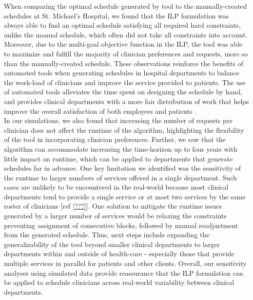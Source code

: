 When comparing the optimal schedule generated by tool to the manually-created schedules at St. Michael's Hospital, we found that the ILP formulation was always able to find an optimal schedule satisfying all required hard constraints, unlike the manual schedule, which often did not take all constraints into account. Moreover, due to the multi-goal objective function in the ILP, the tool was able to maximize and fulfill the majority of clinician preferences and requests, more so than the manually-created schedule. These observations reinforce the benefits of automated tools when generating schedules in hospital departments to balance the work-load of clinicians and improve the service provided to patients. The use of automated tools alleviates the time spent on designing the schedule by hand, and provides clinical departments with a more fair distribution of work that helps improve the overall satisfaction of both employees and patients \cite{silvestro_evaluation_2000}. \\  %

In our simulations, we also found that increasing the number of requests per clinician does not affect the runtime of the algorithm, highlighting the flexibility of the tool in incorporating clinician preferences. Further, we saw that the algorithm can accommodate increasing the time-horizon up to four years with little impact on runtime, which can be applied to departments that generate schedules far in advance. One key limitation we identified was the sensitivity of the runtime to larger numbers of services offered in a single department. Such cases are unlikely to be encountered in the real-world because most clinical departments tend to provide a single service or at most two services by the same roster of clinicians [ref \ref{???}]. One solution to mitigate the runtime issues generated by a larger number of services would be relaxing the constraints preventing assignment of consecutive blocks, followed by manual readjustment from the generated schedule. %
Thus, next steps include expanding the generalizability of the tool beyond smaller clinical departments to larger departments within and outside of health-care - especially those that provide multiple services in parallel for patients and other clients. Overall, our sensitivity analyses using simulated data provide reassurance that the ILP formulation can be applied to schedule clinicians across real-world variability between clinical departments. %